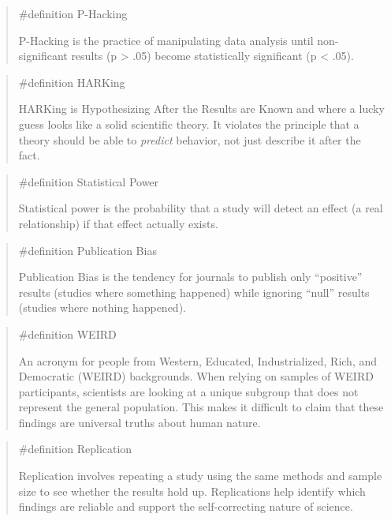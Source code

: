 \documentclass[
  letterpaper,
]{book}
\begin{document}
\begin{quote}
\label{def-phacking}{\#definition} P-Hacking

P-Hacking is the practice of manipulating data analysis until
non-significant results (p \textgreater{} .05) become statistically
significant (p \textless{} .05).
\end{quote}

\begin{quote}
\label{def-harking}{\#definition} HARKing

HARKing is Hypothesizing After the Results are Known and where a lucky
guess looks like a solid scientific theory. It violates the principle
that a theory should be able to \emph{predict} behavior, not just
describe it after the fact.
\end{quote}

\begin{quote}
\label{def-statisticalpower}{\#definition} Statistical
Power

Statistical power is the probability that a study will detect an effect
(a real relationship) if that effect actually exists.
\end{quote}

\begin{quote}
\label{def-publicationbias}{\#definition} Publication
Bias

Publication Bias is the tendency for journals to publish only
``positive'' results (studies where something happened) while ignoring
``null'' results (studies where nothing happened).
\end{quote}

\begin{quote}
\label{def-WEIRD}{\#definition} WEIRD

An acronym for people from Western, Educated, Industrialized, Rich, and
Democratic (WEIRD) backgrounds. When relying on samples of WEIRD
participants, scientists are looking at a unique subgroup that does not
represent the general population. This makes it difficult to claim that
these findings are universal truths about human nature.
\end{quote}

\begin{quote}
\label{def-replication}{\#definition} Replication

Replication involves repeating a study using the same methods and sample
size to see whether the results hold up. Replications help identify
which findings are reliable and support the self-correcting nature of
science.
\end{quote}
\end{document}
